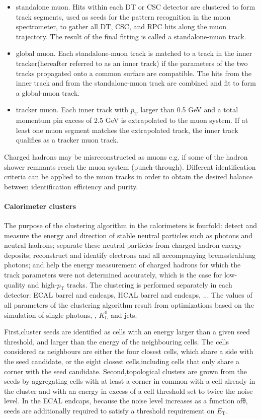  \begin{itemize}
     \item standalone muon.  Hits within each DT or CSC detector are clustered to form track segments,  used as seeds for the pattern recognition in the muon spectrometer,  to gather all DT, CSC, and RPC hits along the muon trajectory.  The result of the final fitting is called a standalone-muon track.
     \item global muon.  Each standalone-muon track is matched to a track in the inner tracker(hereafter referred to as an inner track) if the parameters of the two tracks propagated onto a common surface are compatible.  The hits from the inner track and from the standalone-muon track are combined and fit to form a global-muon track.
     \item tracker muon. Each inner track with $p_{\mathrm{T}}$ larger than 0.5 GeV and a total momentum pin excess of 2.5 GeV is extrapolated to the muon system. If at least one muon segment matches the extrapolated track, the inner track qualifies as a tracker muon track.
 \end{itemize}
 
 Charged hadrons may be misreconstructed as muons e.g. if some of the hadron shower remnants reach the muon system (punch-through).  Different identification criteria can be applied to the muon tracks in order to obtain the desired balance between identification efficiency and purity. 

\paragraph{Calorimeter clusters}

The purpose of the clustering algorithm in the calorimeters is fourfold: detect and measure the energy and direction of stable neutral particles such as photons and neutral hadrons; separate these neutral particles from charged hadron energy deposits; reconstruct and identify electrons and all accompanying bremsstrahlung photons; and help the energy measurement of charged hadrons for which the track parameters were not determined accurately, which is the case for low-quality and high-$p_{\mathrm{T}}$ tracks. The clustering is performed separately in each detector: ECAL barrel and endcaps, HCAL barrel and endcaps, ... The values of all parameters of the clustering algorithm result from optimizations based on the simulation of single photons, \pizero, $K^0_{\mathrm{L}}$ and jets.

First,cluster seeds are identified as cells with an energy larger than a given seed threshold, and larger than the energy of the neighbouring cells. The cells considered as neighbours are either the  four  closest  cells,  which  share  a  side  with  the  seed  candidate,  or  the  eight  closest  cells,including cells that only share a corner with the seed candidate. Second,topological clusters are grown from the seeds by aggregating cells with at least a corner in common with a cell already in the cluster and with an energy in excess of a cell threshold set to twice the noise level. In the ECAL endcaps, because the noise level increases as a function ofθ, seeds are additionally required to satisfy a threshold requirement on $E_{\mathrm{T}}$.

